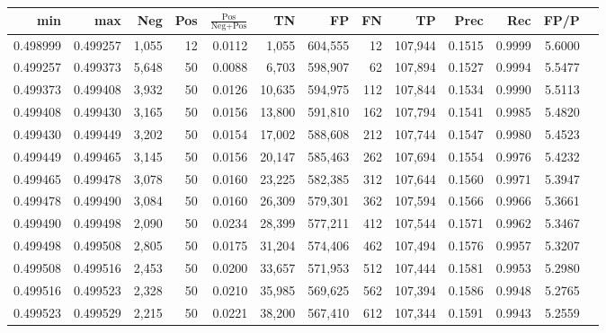 \begin{tabular}{rrrrrrrrrrrrr}
\toprule
     min &      max &   Neg & Pos & $\frac{\text{Pos}}{\text{Neg}+\text{Pos}}$ &      TN &      FP &      FN &      TP &   Prec &    Rec &   FP/P \\
\midrule
0.498999 & 0.499257 & 1,055 &  12 &                                     0.0112 &   1,055 & 604,555 &      12 & 107,944 & 0.1515 & 0.9999 & 5.6000 \\
0.499257 & 0.499373 & 5,648 &  50 &                                     0.0088 &   6,703 & 598,907 &      62 & 107,894 & 0.1527 & 0.9994 & 5.5477 \\
0.499373 & 0.499408 & 3,932 &  50 &                                     0.0126 &  10,635 & 594,975 &     112 & 107,844 & 0.1534 & 0.9990 & 5.5113 \\
0.499408 & 0.499430 & 3,165 &  50 &                                     0.0156 &  13,800 & 591,810 &     162 & 107,794 & 0.1541 & 0.9985 & 5.4820 \\
0.499430 & 0.499449 & 3,202 &  50 &                                     0.0154 &  17,002 & 588,608 &     212 & 107,744 & 0.1547 & 0.9980 & 5.4523 \\
0.499449 & 0.499465 & 3,145 &  50 &                                     0.0156 &  20,147 & 585,463 &     262 & 107,694 & 0.1554 & 0.9976 & 5.4232 \\
0.499465 & 0.499478 & 3,078 &  50 &                                     0.0160 &  23,225 & 582,385 &     312 & 107,644 & 0.1560 & 0.9971 & 5.3947 \\
0.499478 & 0.499490 & 3,084 &  50 &                                     0.0160 &  26,309 & 579,301 &     362 & 107,594 & 0.1566 & 0.9966 & 5.3661 \\
0.499490 & 0.499498 & 2,090 &  50 &                                     0.0234 &  28,399 & 577,211 &     412 & 107,544 & 0.1571 & 0.9962 & 5.3467 \\
0.499498 & 0.499508 & 2,805 &  50 &                                     0.0175 &  31,204 & 574,406 &     462 & 107,494 & 0.1576 & 0.9957 & 5.3207 \\
0.499508 & 0.499516 & 2,453 &  50 &                                     0.0200 &  33,657 & 571,953 &     512 & 107,444 & 0.1581 & 0.9953 & 5.2980 \\
0.499516 & 0.499523 & 2,328 &  50 &                                     0.0210 &  35,985 & 569,625 &     562 & 107,394 & 0.1586 & 0.9948 & 5.2765 \\
0.499523 & 0.499529 & 2,215 &  50 &                                     0.0221 &  38,200 & 567,410 &     612 & 107,344 & 0.1591 & 0.9943 & 5.2559 \\

\end{tabular}
